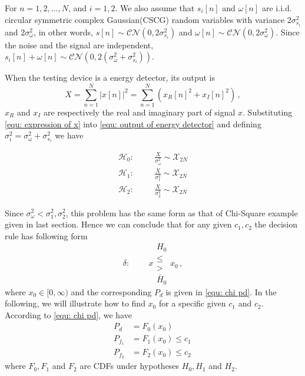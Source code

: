 \documentclass[12pt,journal,a4paper,twoside,doublecolumn]{IEEEtran}
\begin{document}
\begin{spacing}{1.0}
For $n = 1, 2, ..., N$, and $i = 1, 2$. We also assume that $s_i[n]$ and $\omega[n]$ are i.i.d. circular symmetric complex Gaussian(CSCG) random variables with variance $2\sigma_{s_i}^2$ and $2\sigma_{\omega}^2$, in other words, $s[n] \sim \mathcal{CN}(0, 2\sigma_{s_i}^2) $ and $\omega[n] \sim \mathcal{CN}(0, 2\sigma_\omega^2)$. Since the noise and the signal are independent, $s_i[n] + \omega[n] \sim \mathcal{CN}(0, 2(\sigma_\omega^2 + \sigma_{s_i}^2))$.

When the testing device is a energy detector, its output is
\begin{equation}
  \label{equ: output of energy detector}
  X = \sum_{n=1}^{N}|x[n]|^2 = \sum_{n=1}^{N}(x_R[n]^2+x_I[n]^2)\,,
\end{equation}
$x_R$ and $x_I$ are respectively the real and imaginary part of signal $x$. Substituting \eqref{equ: expression of x} into \eqref{equ: output of energy detector} and defining $\sigma_{i}^2 = \sigma_\omega^2 + \sigma_{s_i}^2$ we have

  \begin{equation}
   \label{v3eq7}
   \begin{split}
     \mathcal{H}_0:\;\;\;\;\;\;&\frac{X}{\sigma_\omega^2} \sim \mathcal{X}_{2N}\\
     \mathcal{H}_1:\;\;\;\;\;\;&\frac{X}{\sigma_1^2} \sim \mathcal{X}_{2N}\\
     \mathcal{H}_2:\;\;\;\;\;\;&\frac{X}{\sigma_{2}^2} \sim \mathcal{X}_{2N}
     \end{split}
 \end{equation}

Since $\sigma_\omega^2 < \sigma_1^2, \sigma_2^2$, this problem has the same form as that of Chi-Square example given in last section.
Hence we can conclude that for any given $c_1, c_2$ the decision rule has following form
\begin{equation}
\label{equ: decision rule for spectrum sensing}
\delta:\;\;\;\;\;\;\;\; x \substack{H_0 \\ \leq \\ > \\\bar{H}_0} x_0\,,
 \end{equation}
where $x_0 \in [0, \infty)$ and  the corresponding $P_d$ is given in \eqref{equ: chi pd}. In the following, we will illustrate how to find $x_0$ for a specific given $c_1$ and $c_2$.
According to \eqref{equ: chi pd}, we have 
\begin{equation}
\begin{split}
\label{equ: Pd c1}
P_{d} &= F_0(x_0)\\
P_{f_1} &= F_1(x_0) \leq c_1 \\
P_{f_2} &= F_2(x_0) \leq c_2\,
\end{split}
\end{equation}
where $F_0, F_1$ and $F_2$ are CDFs under hypotheses $H_0, H_1$ and $H_2$.


\end{spacing}
\end{document}

